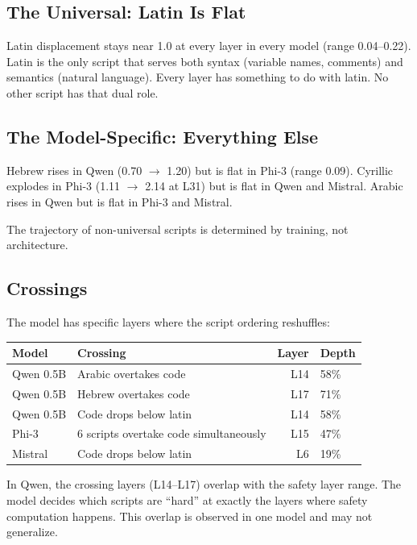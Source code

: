 \documentclass[11pt,a4paper]{article}
\begin{document}
\subsection{The Universal: Latin Is Flat}

Latin displacement stays near 1.0 at every layer in every model (range 0.04--0.22). Latin is the only script that serves both syntax (variable names, comments) and semantics (natural language). Every layer has something to do with latin. No other script has that dual role.

\subsection{The Model-Specific: Everything Else}

Hebrew rises in Qwen (0.70 $\to$ 1.20) but is flat in Phi-3 (range 0.09). Cyrillic explodes in Phi-3 (1.11 $\to$ 2.14 at L31) but is flat in Qwen and Mistral. Arabic rises in Qwen but is flat in Phi-3 and Mistral.

The trajectory of non-universal scripts is determined by training, not architecture.

\subsection{Crossings}

The model has specific layers where the script ordering reshuffles:

\begin{center}
\begin{tabular}{llrl}
\toprule
\textbf{Model} & \textbf{Crossing} & \textbf{Layer} & \textbf{Depth} \\
\midrule
Qwen 0.5B & Arabic overtakes code & L14 & 58\% \\
Qwen 0.5B & Hebrew overtakes code & L17 & 71\% \\
Qwen 0.5B & Code drops below latin & L14 & 58\% \\
Phi-3 & 6 scripts overtake code simultaneously & L15 & 47\% \\
Mistral & Code drops below latin & L6 & 19\% \\
\bottomrule
\end{tabular}
\end{center}

In Qwen, the crossing layers (L14--L17) overlap with the safety layer range. The model decides which scripts are ``hard'' at exactly the layers where safety computation happens. This overlap is observed in one model and may not generalize.
\end{document}
